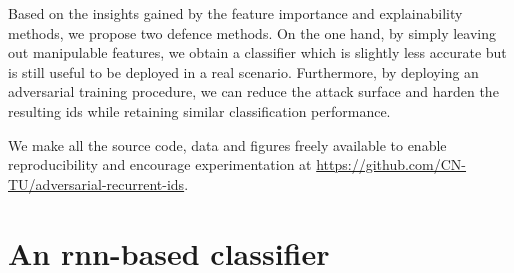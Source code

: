 \documentclass[conference]{IEEEtran}
\begin{document}
Based on the insights gained by the feature importance and explainability methods, we propose two defence methods.
On the one hand, by simply leaving out manipulable features, we obtain a classifier which is slightly less accurate but is still useful to be deployed in a real scenario. Furthermore,
by deploying an adversarial training procedure,
we can reduce the attack surface and harden the resulting \gls{ids} while retaining similar classification performance. %

We make all the source code, data and figures freely available to enable reproducibility and encourage experimentation at \url{https://github.com/CN-TU/adversarial-recurrent-ids}.

\section{An \gls{rnn}-based classifier}
\end{document}
